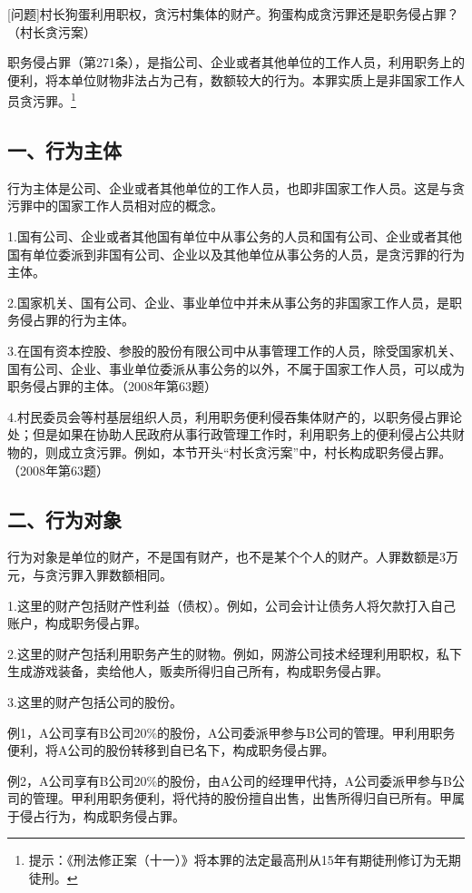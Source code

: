 [问题]村长狗蛋利用职权，贪污村集体的财产。狗蛋构成贪污罪还是职务侵占罪？（村长贪污案）

职务侵占罪（第271条），是指公司、企业或者其他单位的工作人员，利用职务上的便利，将本单位财物非法占为己有，数额较大的行为。本罪实质上是非国家工作人员贪污罪。\footnote{提示：《刑法修正案（十一）》将本罪的法定最高刑从15年有期徒刑修订为无期徒刑。}

\subsection*{一、行为主体}

行为主体是公司、企业或者其他单位的工作人员，也即非国家工作人员。这是与贪污罪中的国家工作人员相对应的概念。

1.国有公司、企业或者其他国有单位中从事公务的人员和国有公司、企业或者其他国有单位委派到非国有公司、企业以及其他单位从事公务的人员，是贪污罪的行为主体。

2.国家机关、国有公司、企业、事业单位中并未从事公务的非国家工作人员，是职务侵占罪的行为主体。

3.在国有资本控股、参股的股份有限公司中从事管理工作的人员，除受国家机关、国有公司、企业、事业单位委派从事公务的以外，不属于国家工作人员，可以成为职务侵占罪的主体。（2008年第63题）

4.村民委员会等村基层组织人员，利用职务便利侵吞集体财产的，以职务侵占罪论处；但是如果在协助人民政府从事行政管理工作时，利用职务上的便利侵占公共财物的，则成立贪污罪。例如，本节开头“村长贪污案”中，村长构成职务侵占罪。（2008年第63题）

\subsection*{二、行为对象}

行为对象是单位的财产，不是国有财产，也不是某个个人的财产。人罪数额是3万元，与贪污罪入罪数额相同。

1.这里的财产包括财产性利益（债权）。例如，公司会计让债务人将欠款打入自己账户，构成职务侵占罪。

2.这里的财产包括利用职务产生的财物。例如，网游公司技术经理利用职权，私下生成游戏装备，卖给他人，贩卖所得归自己所有，构成职务侵占罪。

3.这里的财产包括公司的股份。

例1，A公司享有B公司20\%的股份，A公司委派甲参与B公司的管理。甲利用职务便利，将A公司的股份转移到自已名下，构成职务侵占罪。

例2，A公司享有B公司20\%的股份，由A公司的经理甲代持，A公司委派甲参与B公司的管理。甲利用职务便利，将代持的股份擅自出售，出售所得归自已所有。甲属于侵占行为，构成职务侵占罪。

